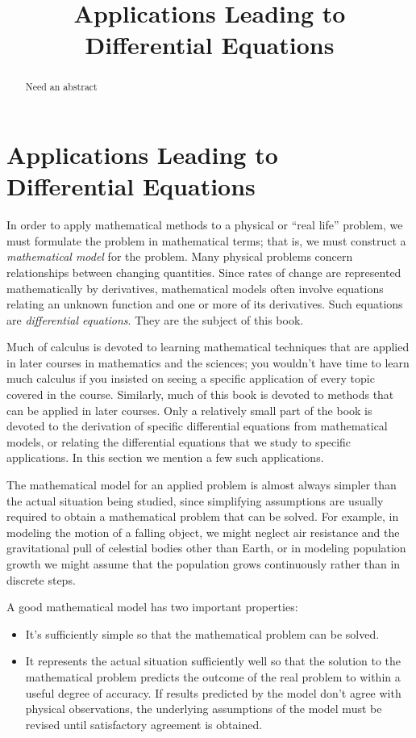 \documentclass{ximera}
\title{Applications Leading to Differential Equations}
\begin{document}
\begin{abstract}
Need an abstract
\end{abstract}

\maketitle

\section*{Applications Leading to Differential Equations}

In order to apply mathematical methods to a physical or ``real life''
problem, we must  formulate the problem in mathematical
terms; that is, we must construct a {\color{blue}\it mathematical
model\/} for the
problem. Many physical problems concern relationships between changing
quantities. Since rates of change are represented mathematically by
derivatives, mathematical models often involve equations relating an
unknown function and one or more of its derivatives. Such equations
are  {\color{blue}\it differential equations}. They are the subject of this
book.

Much of calculus is devoted to learning mathematical techniques that
are applied in later courses in mathematics and the sciences;     you
wouldn't have time to learn much calculus if you insisted on seeing
a specific application of every topic covered in the course.
Similarly, much of this book is devoted to methods that can be applied
in later courses. Only a relatively small part of the book is devoted
to the derivation of specific differential equations from mathematical
models, or relating the differential equations that we study to
specific applications. In this section we mention a few such
applications.

The mathematical model for an applied problem is almost always simpler
than the actual situation being studied, since simplifying assumptions
are usually required to obtain a mathematical problem that can be
solved. For example, in modeling the motion of a falling object, we
might neglect air resistance and the gravitational pull of celestial
bodies other than Earth, or in  modeling  population growth we
might assume that the population grows continuously rather than in
discrete steps.

A good mathematical model has two important properties:

\begin{itemize}
\item It's sufficiently simple so that the mathematical problem
can be solved.

\item It represents the actual situation sufficiently well so that the
solution to the mathematical problem predicts the outcome of the real
problem to within a useful degree of accuracy. If results predicted by
the model don't agree with physical observations, the
underlying
assumptions of the model must be revised until satisfactory agreement
is obtained.
\end{itemize}
\end{document}
